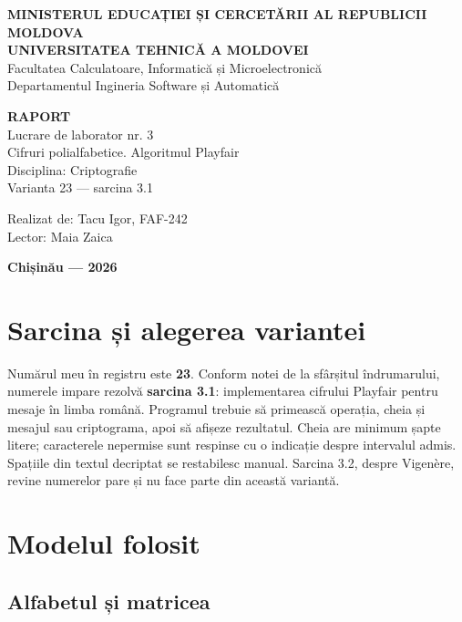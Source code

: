 \documentclass[12pt,a4paper]{article}
\begin{document}
\begin{titlepage}
\begin{center}
\textbf{MINISTERUL EDUCAȚIEI ȘI CERCETĂRII AL REPUBLICII MOLDOVA}\\[0.5em]
\textbf{UNIVERSITATEA TEHNICĂ A MOLDOVEI}\\
Facultatea Calculatoare, Informatică și Microelectronică\\
Departamentul Ingineria Software și Automatică
\vspace{3cm}

{\Large\bfseries RAPORT}\\[0.7em]
{\large Lucrare de laborator nr. 3}\\[0.5em]
{\large Cifruri polialfabetice. Algoritmul Playfair}\\[0.7em]
Disciplina: Criptografie\\
Varianta 23 --- sarcina 3.1
\vspace{2.5cm}

\begin{flushright}
Realizat de: Tacu Igor, FAF-242\\[0.5em]
Lector: Maia Zaica
\end{flushright}
\vfill
\textbf{Chișinău --- 2026}
\end{center}
\end{titlepage}

\tableofcontents
\newpage
{}

\section{Sarcina și alegerea variantei}

Numărul meu în registru este \textbf{23}. Conform notei de la sfârșitul îndrumarului,
numerele impare rezolvă \textbf{sarcina 3.1}: implementarea cifrului Playfair pentru
mesaje în limba română. Programul trebuie să primească operația, cheia și mesajul
sau criptograma, apoi să afișeze rezultatul. Cheia are minimum șapte litere;
caracterele nepermise sunt respinse cu o indicație despre intervalul admis.
Spațiile din textul decriptat se restabilesc manual. Sarcina 3.2, despre Vigenère,
revine numerelor pare și nu face parte din această variantă.

\section{Modelul folosit}

\subsection{Alfabetul și matricea}
\end{document}
